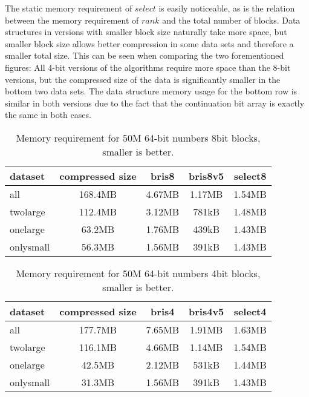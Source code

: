 The static memory requirement of $select$ is easily noticeable, 
as is the relation between the memory requirement of $rank$ and the total number of blocks. Data structures in versions with smaller block size naturally take more space, but smaller block 
size allows better compression in some data sets and therefore a smaller total size. This can be seen when comparing the two forementioned figures: All 4-bit versions of the algorithms require
more space than the 8-bit versions, but the compressed size of the data is significantly smaller in the bottom two data sets. The data structure memory usage for the bottom row is similar in both versions 
due to the fact that the continuation bit array is exactly the same in both cases.




\begin{table}
\centering
\begin{tabular}{l|| c c c c } 
dataset   & compressed size & bris8  & bris8v5 & select8  \\
 \hline \hline 
all       & 168.4MB         & 4.67MB & 1.17MB   & 1.54MB    \\
twolarge  & 112.4MB         & 3.12MB & 781kB    & 1.48MB    \\
onelarge  &  63.2MB         & 1.76MB & 439kB    & 1.43MB    \\
onlysmall &  56.3MB         & 1.56MB & 391kB    & 1.43MB    \\


\hline
%
\end{tabular}
\caption{Memory requirement for 50M 64-bit numbers 8bit blocks, smaller is better.\label{table:results8bit}}
\end{table}

\begin{table}
\centering
\begin{tabular}{l|| c c c c } 
dataset   & compressed size & bris4  & bris4v5 & select4  \\
 \hline \hline 
all       & 177.7MB         & 7.65MB & 1.91MB  & 1.63MB \\
twolarge  & 116.1MB         & 4.66MB & 1.14MB  & 1.54MB \\
onelarge  & 42.5MB          & 2.12MB & 531kB   & 1.44MB \\
onlysmall & 31.3MB          & 1.56MB & 391kB   & 1.43MB \\


\hline
%
\end{tabular}
\caption{Memory requirement for 50M 64-bit numbers 4bit blocks, smaller is better.\label{table:results4bit}}
\end{table}

